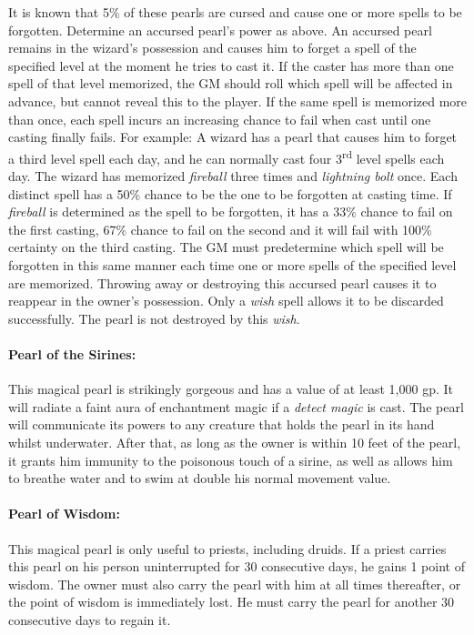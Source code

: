 \begin{multicols}{2}
It is known that 5\% of these pearls are cursed and cause one or more spells to be forgotten.  Determine an accursed pearl's power as above.  An accursed pearl remains in the wizard's possession and causes him to forget a spell of the specified level at the moment he tries to cast it.  If the caster has more than one spell of that level memorized, the GM should roll which spell will be affected in advance, but cannot reveal this to the player.  If the same spell is memorized more than once, each spell incurs an increasing chance to fail when cast until one casting finally fails.  For example: A wizard has a pearl that causes him to forget a third level spell each day, and he can normally cast four 3\textsuperscript{rd} level spells each day.  The wizard has memorized \textit{fireball} three times and \textit{lightning bolt} once.  Each distinct spell has a 50\% chance to be the one to be forgotten at casting time.  If \textit{fireball} is determined as the spell to be forgotten, it has a 33\% chance to fail on the first casting, 67\% chance to fail on the second and it will fail with 100\% certainty on the third casting.  The GM must predetermine which spell will be forgotten in this same manner each time one or more spells of the specified level are memorized.  Throwing away or destroying this accursed pearl causes it to reappear in the owner's possession.  Only a \textit{wish} spell allows it to be discarded successfully.  The pearl is not destroyed by this \textit{wish}.

\paragraph{Pearl of the Sirines:} This magical pearl is strikingly gorgeous and has a value of at least 1,000 gp.  It will radiate a faint aura of enchantment magic if a \textit{detect magic} is cast.  The pearl will communicate its powers to any creature that holds the pearl in its hand whilst underwater.  After that, as long as the owner is within 10 feet of the pearl, it grants him immunity to the poisonous touch of a sirine, as well as allows him to breathe water and to swim at double his normal movement value.

\paragraph{Pearl of Wisdom:} This magical pearl is only useful to priests, including druids.  If a priest carries this pearl on his person uninterrupted for 30 consecutive days, he gains 1 point of wisdom.  The owner must also carry the pearl with him at all times thereafter, or the point of wisdom is immediately lost.  He must carry the pearl for another 30 consecutive days to regain it. 


\end{multicols}
